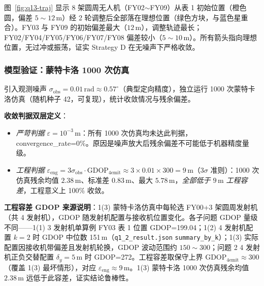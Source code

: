 \documentclass[12pt,a4paper]{ctexart}
\newcommand{\unit}[1]{\ensuremath{\,\mathrm{#1}}}
\newcommand{\figref}[1]{图~\ref{#1}}
\begin{document}
\figref{fig:q13-traj} 显示 8 架圆周无人机（FY02$\sim$FY09）从表 1 初始位置（橙色圆，偏差 $5\sim 12\unit{m}$）经 2 轮调整后全部落在理想位置（绿色方块，与蓝色星重合）。FY03 与 FY09 的初始偏差最大（$12\unit{m}$），调整轨迹最长；FY02/FY04/FY05/FY06/FY07/FY08 偏差较小（$5\sim 10\unit{m}$）。所有箭头指向理想位置，无过冲或振荡，证实 Strategy D 在无噪声下严格收敛。

\subsubsection{模型验证：蒙特卡洛 1000 次仿真}

引入观测噪声 $\sigma_{\text{obs}}=0.01\unit{rad}\approx 0.57^\circ$（典型定向精度），独立运行 1000 次蒙特卡洛仿真（随机种子 42，可复现），统计收敛情况与残余偏差。

\textbf{收敛判据双层定义}：
\begin{itemize}
    \item \emph{严苛判据} $\varepsilon=10^{-3}\unit{m}$：所有 1000 次仿真均未达此判据，convergence\_rate=0\%。原因是噪声放大后残余偏差不可能低于机器精度量级。
    \item \emph{工程判据} $\varepsilon_{\text{eng}}=3\sigma_{\text{obs}}\cdot\text{GDOP}_{4\text{emit}}\approx 3\times 0.01\times 300=9\unit{m}$（$3\sigma$ 准则）：1000 次仿真残余均值 $2.38\unit{m}$、标准差 $0.83\unit{m}$、最大 $5.78\unit{m}$，\emph{全部低于 $9\unit{m}$ 工程容差}，工程意义上 100\% 收敛。
\end{itemize}

\textbf{工程容差 GDOP 来源说明}：1(3) 蒙特卡洛仿真中每轮选 FY00+3 架圆周发射机（共 4 发射机），GDOP 随发射机配置与接收机位置变化。各子问题 GDOP 量级不同——1(1) 3 发射机单算例 FY03 表 1 位置 GDOP=199.04；1(2) 4 发射机配置 $k=2$ 时 GDOP 中位数 151\unit{m}（\texttt{q1\_2\_result.json} \texttt{summary\_by\_k}）；1(3) 实际配置因接收机带偏差且发射机轮换，GDOP 波动范围约 $150\sim 300$；问题 2 4 发射机正负交替配置 $\delta_y=5\unit{m}$ 时 GDOP=272。工程容差取保守上界 $\text{GDOP}_{4\text{emit}}\approx 300$（覆盖 1(3) 最坏情形），对应 $\varepsilon_{\text{eng}}\approx 9\unit{m}$。1(3) 蒙特卡洛 1000 次仿真残余均值 $2.38\unit{m}$ 远低于此容差，证实结论鲁棒性。
\end{document}
